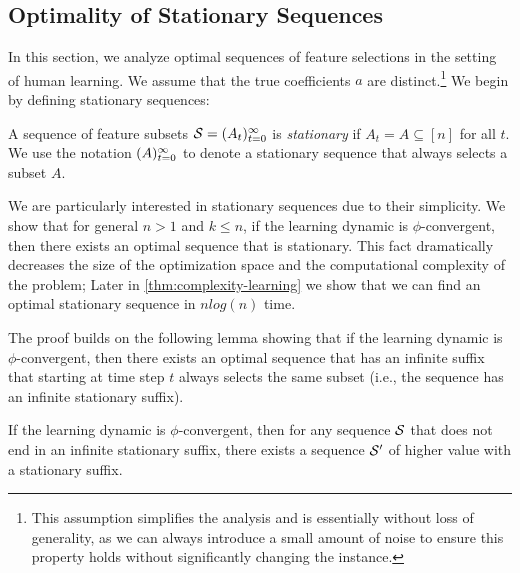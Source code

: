 \subsection{Optimality of Stationary Sequences} \label{sec:stationary}

In this section, we analyze optimal sequences of feature selections in the setting of human learning. %
We assume that the true coefficients $a$ are distinct.\footnote{This assumption simplifies the analysis and is essentially without loss of generality, as we can always introduce a small amount of noise to ensure this property holds without significantly changing the instance.}  We begin by defining stationary sequences:


\begin{definition}
	A sequence of feature subsets $\mathcal{S} = (A_t)_{t=0}^\infty$ is {\em stationary} if  $A_t = A \subseteq [n]$ for all $t$. We use the notation $(A)_{t=0}^\infty$ to denote  a stationary sequence that always selects a subset $A$.
\end{definition}

We are particularly interested in stationary sequences due to their simplicity. We show that for general $n > 1$ and $k \leq n$,  
if the learning dynamic is $\phi$-convergent, then there exists an optimal sequence that is stationary. 
This fact dramatically decreases the size of the optimization space and the computational complexity of the problem; Later in  \cref{thm:complexity-learning} we show that we can find an optimal stationary sequence in $nlog(n)$ time. 



 The proof builds on the following lemma showing that if the learning dynamic is $\phi$-convergent, then there exists an 
 optimal sequence that has an infinite suffix that starting at time step $t$ always selects the same subset (i.e., the sequence has an infinite stationary suffix). 
 



\begin{lemma} \label{lem:constant-suffix}
	If the learning dynamic is $\phi$-convergent, then for any sequence $\mathcal{S}$ {that does not end in an infinite stationary suffix}, there exists a sequence $\mathcal{S}'$ of higher value with a stationary suffix.
\end{lemma}


